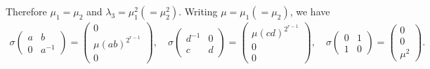 Therefore $\mu_1 = \mu_2$ and $\lambda_3 = \mu_1^2 (=\mu_2^2)$. Writing $\mu = \mu_1 (=\mu_2)$, we have
\begin{align*}
\sigma\left(\begin{matrix}a & b\\0 & a^{-1}\end{matrix}\right) = \left(\begin{matrix}0 \\ \mu(ab)^{2^{r-1}}\\ 0\end{matrix}\right), \quad
\sigma\left(\begin{matrix}d^{-1} & 0\\c & d\end{matrix}\right) = \left(\begin{matrix}\mu(cd)^{2^{r-1}}\\ 0\\0\end{matrix}\right), \quad
\sigma\left(\begin{matrix}0 & 1\\1 & 0\end{matrix}\right) = \left(\begin{matrix}0\\ 0\\ \mu^2\end{matrix}\right).
\end{align*}

